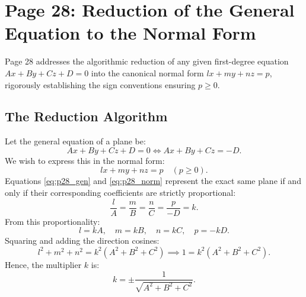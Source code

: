 \section{Page 28: Reduction of the General Equation to the Normal Form}
\label{sec:page28}

\begin{conceptbox}
Page 28 addresses the algorithmic reduction of any given first-degree equation $Ax + By + Cz + D = 0$ into the canonical normal form $lx + my + nz = p$, rigorously establishing the sign conventions ensuring $p \ge 0$.
\end{conceptbox}

\subsection{The Reduction Algorithm}
Let the general equation of a plane be:
\begin{equation}
    Ax + By + Cz + D = 0 \iff Ax + By + Cz = -D. \label{eq:p28_gen}
\end{equation}
We wish to express this in the normal form:
\begin{equation}
    lx + my + nz = p \quad (p \ge 0). \label{eq:p28_norm}
\end{equation}
Equations \eqref{eq:p28_gen} and \eqref{eq:p28_norm} represent the exact same plane if and only if their corresponding coefficients are strictly proportional:
\begin{equation}
    \frac{l}{A} = \frac{m}{B} = \frac{n}{C} = \frac{p}{-D} = k.
\end{equation}
From this proportionality:
\begin{equation}
    l = kA, \quad m = kB, \quad n = kC, \quad p = -kD.
\end{equation}
Squaring and adding the direction cosines:
\begin{equation}
    l^2 + m^2 + n^2 = k^2(A^2 + B^2 + C^2) \implies 1 = k^2(A^2 + B^2 + C^2).
\end{equation}
Hence, the multiplier $k$ is:
\begin{equation}
    k = \pm \frac{1}{\sqrt{A^2 + B^2 + C^2}}.
\end{equation}

